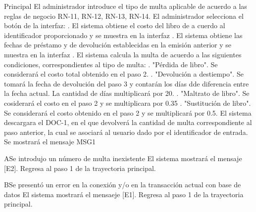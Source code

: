 \begin{UCtrayectoria}{Principal}
	\UCpaso[\UCactor] El administrador introduce el tipo de multa aplicable de acuerdo a las reglas de negocio RN-11, RN-12, RN-13, RN-14.
	\UCpaso[\UCactor] El administrador selecciona el botón  de la interfaz: . 
	\UCpaso[\UCsist] El sistema obtiene el costo del libro de a cuerdo al identificador proporcionado y se muestra en la interfaz . 
	\UCpaso[\UCsist] El sistema obtiene las fechas de préstamo y de devolución establecidas en la emisión anterior y se muestra en la interfaz . 
	\UCpaso[\UCsist] El sistema calcula la multa de acuerdo a las siguientes condiciones, correspondientes al tipo de multa: . "Pérdida de libro". Se considerará el costo total obtenido en el paso 2. . "Devolución a destiempo". Se tomará la fecha de devolución del paso 3 y contarán los días dde diferencia entre la fecha actual. La cantidad de días multiplicará por 20. . "Maltrato de libro". Se cosiderará el costo en el paso 2 y se multiplicara por 0.35 . "Sustitución de libro". Se considerará el costo obtenido en el paso 2 y se multiplicará por 0.5.
	\UCpaso[\UCsist] El sistema descargara el DOC-1, en el que devolverá la cantidad de multa correspondiente al paso anterior, la cual se asociará al usuario dado por el identificador de entrada.  
	\UCpaso[\UCsist] Se mostrará el mensaje MSG1
\end{UCtrayectoria}
\begin{UCtrayectoriaA}{A}{Se introdujo un número de multa inexistente}	
			\UCpaso[\UCsist] El sistema mostrará el mensaje [E2].
			\UCpaso[\UCsist] Regresa al paso 1 de la trayectoria principal. 
\end{UCtrayectoriaA}
\begin{UCtrayectoriaA}{B}{Se presentó un error en la conexión y/o en la transacción actual con base de datos}
			\UCpaso[\UCsist] El sistema mostrará el mensaeje [E1].
			\UCpaso[\UCsist] Regresa al paso 1 de la trayectoria principal.
\end{UCtrayectoriaA}